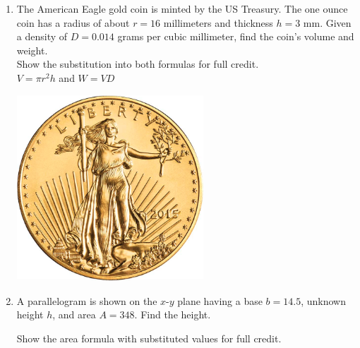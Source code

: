 \documentclass[12pt, twoside]{article}
\begin{document}
\begin{enumerate}
\newpage
\item The American Eagle gold coin is minted by the US Treasury. The one ounce coin has a radius of about $r=16$ millimeters and thickness $h=3$ mm. Given a density of $D = 0.014$ grams per cubic millimeter, find the coin's volume and weight. \\[0.25cm]
Show the substitution into both formulas for full credit.\\[0.5cm]
$\displaystyle V = \pi r^2 h$ and $W=VD$
  \begin{flushright}
    \includegraphics[width=7cm]{6-15-5-coin.png}
  \end{flushright}
  
  
\newpage
\item A parallelogram is shown on the $x$-$y$ plane having a base $b=14.5$, unknown height $h$, and area $A=348$. Find the height. 
  \begin{multicols}{2}
    Show the area formula with substituted values for full credit.
      \begin{flushright}
      \end{flushright}
  \end{multicols} 


\end{enumerate}
\end{document}
